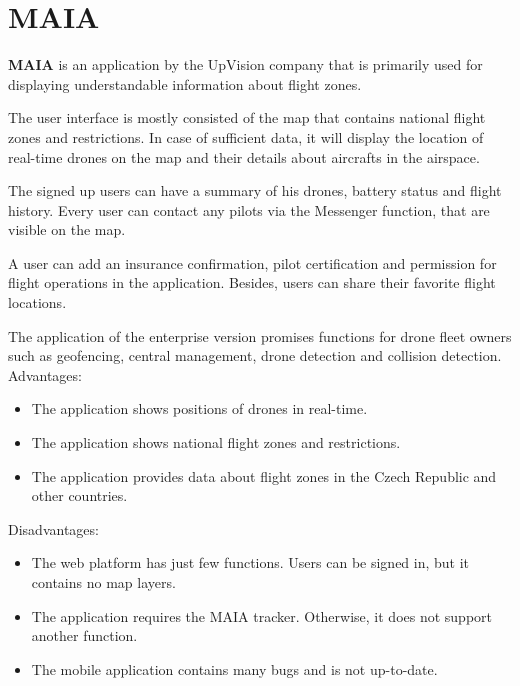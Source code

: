 \section{MAIA}\label{sec:maia}
\textbf{MAIA} is an application by the UpVision company that is primarily used for displaying understandable information about flight zones.~\cite{maia}

The user interface is mostly consisted of the map that contains national flight zones and restrictions.
In case of sufficient data, it will display the location of real-time drones on the map and their details about aircrafts in the airspace.

The signed up users can have a summary of his drones, battery status and flight history.
Every user can contact any pilots via the Messenger function, that are visible on the map.

A user can add an insurance confirmation, pilot certification and permission for flight operations in the application.
Besides, users can share their favorite flight locations.

The application of the enterprise version promises functions for drone fleet owners such as geofencing, central management, drone detection and collision detection.
\newline
\newline
Advantages:
\begin{itemize}
    \item The application shows positions of drones in real-time.
    \item The application shows national flight zones and restrictions.
    \item The application provides data about flight zones in the Czech Republic and other countries.
\end{itemize}
Disadvantages:
\begin{itemize}
    \item The web platform has just few functions.
    Users can be signed in, but it contains no map layers.
    \item The application requires the MAIA tracker.
    Otherwise, it does not support another function.~\cite{maia}
    \item The mobile application contains many bugs and is not up-to-date.
\end{itemize}
